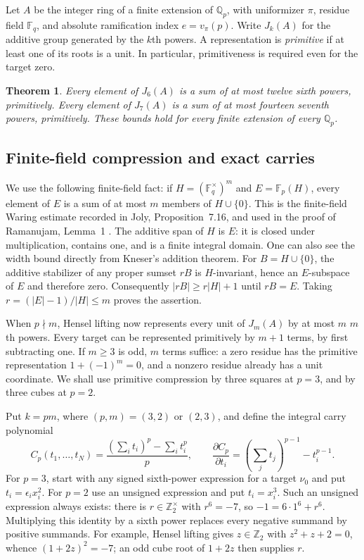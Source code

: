 \documentclass[11pt,reqno]{amsart}
\numberwithin{equation}{section}
\newtheorem{theorem}{Theorem}[section]
\theoremstyle{definition}
\begin{document}
Let $A$ be the integer ring of a finite extension of $\mathbb Q_p$,
with uniformizer $\pi$, residue field $\mathbb F_q$, and absolute
ramification index $e=v_\pi(p)$. Write $J_k(A)$ for the additive group
generated by the $k$th powers. A representation is \emph{primitive}
if at least one of its roots is a unit. In particular, primitiveness
is required even for the target zero.

\begin{theorem}\label{thm:lh6-local}
Every element of $J_6(A)$ is a sum of at most twelve sixth powers,
primitively. Every element of $J_7(A)$ is a sum of at most fourteen
seventh powers, primitively. These bounds hold for every finite
extension of every $\mathbb Q_p$.
\end{theorem}

\subsection{Finite-field compression and exact carries}

We use the following finite-field fact: if $H=(\mathbb F_q^\times)^m$
and $E=\mathbb F_p(H)$, every element of $E$ is a sum of at most $m$
members of $H\cup\{0\}$. This is the finite-field Waring estimate
recorded in Joly, Proposition~7.16, and used in the proof of
Ramanujam, Lemma~1 \cite{Joly1970,Ramanujam1963}. The additive span of
$H$ is $E$: it is closed under multiplication, contains one, and is
a finite integral domain. One can also see the width bound directly
from Kneser's addition theorem. For $B=H\cup\{0\}$, the additive
stabilizer of any proper sumset $rB$ is $H$-invariant, hence an
$E$-subspace of $E$ and therefore zero. Consequently
$|rB|\ge r|H|+1$ until $rB=E$. Taking
$r=(|E|-1)/|H|\le m$ proves the assertion.

When $p\nmid m$, Hensel lifting now represents every unit of $J_m(A)$
by at most $m$ $m$th powers. Every target can be represented
primitively by $m+1$ terms, by first subtracting one. If $m\ge3$ is
odd, $m$ terms suffice: a zero residue has the primitive representation
$1+(-1)^m=0$, and a nonzero residue already has a unit coordinate.
We shall use primitive compression by three squares at $p=3$, and
by three cubes at $p=2$.

Put $k=pm$, where $(p,m)=(3,2)$ or $(2,3)$, and define the integral
carry polynomial
\[
 C_p(t_1,\ldots,t_N)
   =\frac{(\sum_i t_i)^p-\sum_i t_i^p}{p},\qquad
 \frac{\partial C_p}{\partial t_i}
   =(\sum_jt_j)^{p-1}-t_i^{p-1}.
\]
For $p=3$, start with any signed sixth-power expression for a target
$\nu_0$ and put $t_i=\epsilon_i x_i^2$. For $p=2$ use an unsigned
expression and put $t_i=x_i^3$. Such an unsigned expression always
exists: there is $r\in\mathbb Z_2^\times$ with $r^6=-7$, so
$-1=6\cdot1^6+r^6$. Multiplying this identity by a sixth power
replaces every negative summand by positive summands.
For example, Hensel lifting gives $z\in\mathbb Z_2$ with
$z^2+z+2=0$, whence $(1+2z)^2=-7$; an odd cube root of $1+2z$
then supplies $r$.
\end{document}
